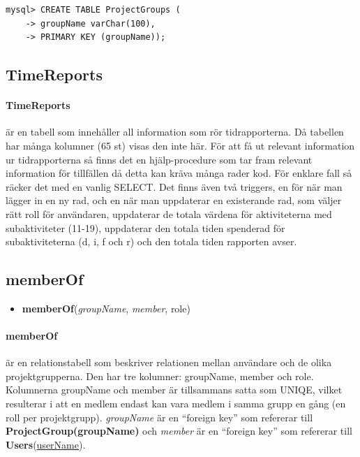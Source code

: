 \documentclass[paper=a4, fontsize=11pt,twoside]{article}
\begin{document}
\begin{lstlisting}[frame=single, caption={Tabellen kan konstrueras med följande SQL-satser:}]
mysql> CREATE TABLE ProjectGroups (
    -> groupName varChar(100),
    -> PRIMARY KEY (groupName));
\end{lstlisting}

\subsection{TimeReports}
\paragraph{TimeReports} är en tabell som innehåller all information som rör tidrapporterna. Då tabellen har många kolumner (65 st) visas den inte här. För att få ut relevant information ur tidrapporterna så finns det en hjälp-procedure som tar fram relevant information för tillfällen då detta kan kräva många rader kod. För enklare fall så räcker det med en vanlig SELECT. Det finns även två triggers, en för när man lägger in en ny rad, och en när man uppdaterar en existerande rad, som väljer rätt roll för användaren, uppdaterar de totala värdena för aktiviteterna med subaktiviteter (11-19), uppdaterar den totala tiden spenderad för subaktiviteterna (d, i, f och r) och den totala tiden rapporten avser.

\subsection{memberOf}
\begin{itemize}
\item[] \textbf{memberOf}(\textit{groupName}, \textit{member}, role)
\end{itemize}
\paragraph{memberOf} är en relationstabell som beskriver relationen mellan användare och de olika projektgrupperna. Den har tre kolumner: groupName, member och role. Kolumnerna groupName och member är tillsammans satta som UNIQE, vilket resulterar i att en medlem endast kan vara medlem i samma grupp en gång (en roll per projektgrupp). \textit{groupName} är en ``foreign key'' som refererar till \textbf{ProjectGroup(groupName)} och \textit{member} är en ``foreign key'' som refererar till \textbf{Users}(\underline{userName}).\newline
\end{document}
